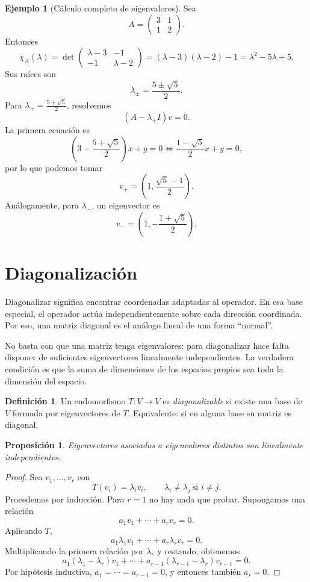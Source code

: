\documentclass[10pt,a4paper,oneside]{article}
\theoremstyle{plain}
\newtheorem{proposition}[theorem]{Proposición}
\theoremstyle{definition}
\newtheorem{definition}[theorem]{Definición}
\newtheorem{example}[theorem]{Ejemplo}
\theoremstyle{remark}
\newcommand{\charpol}{\chi}
\begin{document}
\begin{example}[Cálculo completo de eigenvalores]
Sea
\[
A=
\begin{pmatrix}
3 & 1\\
1 & 2
\end{pmatrix}.
\]
Entonces
\[
\charpol_A(\lambda)=
\det\begin{pmatrix}
\lambda-3 & -1\\
-1 & \lambda-2
\end{pmatrix}
=(\lambda-3)(\lambda-2)-1
=\lambda^2-5\lambda+5.
\]
Sus raíces son
\[
\lambda_{\pm}=\frac{5\pm\sqrt{5}}{2}.
\]
Para \(\lambda_+=\frac{5+\sqrt5}{2}\), resolvemos
\[
(A-\lambda_+ I)v=0.
\]
La primera ecuación es
\[
\left(3-\frac{5+\sqrt5}{2}\right)x+y=0
\iff
\frac{1-\sqrt5}{2}x+y=0,
\]
por lo que podemos tomar
\[
v_+=\left(1,\frac{\sqrt5-1}{2}\right).
\]
Análogamente, para \(\lambda_-\), un eigenvector es
\[
v_-\!=\!\left(1,-\frac{1+\sqrt5}{2}\right).
\]
\end{example}

\section{Diagonalización}
\begin{methodBox}
Diagonalizar significa encontrar coordenadas adaptadas al operador. En esa base especial, el operador actúa independientemente sobre cada dirección coordinada. Por eso, una matriz diagonal es el análogo lineal de una forma ``normal''.
\end{methodBox}

\begin{warningBox}
No basta con que una matriz tenga eigenvalores: para diagonalizar hace falta disponer de suficientes eigenvectores linealmente independientes. La verdadera condición es que la suma de dimensiones de los espacios propios sea toda la dimensión del espacio.
\end{warningBox}
\begin{definition}
Un endomorfismo \(T:V\to V\) es \emph{diagonalizable} si existe una base de \(V\) formada por eigenvectores de \(T\). Equivalente: si en alguna base su matriz es diagonal.
\end{definition}

\begin{proposition}
Eigenvectores asociados a eigenvalores distintos son linealmente independientes.
\end{proposition}

\begin{proof}
Sea \(v_1,\dots,v_r\) con
\[
T(v_i)=\lambda_i v_i,
\qquad
\lambda_i\neq \lambda_j\ \text{si }i\neq j.
\]
Procedemos por inducción. Para \(r=1\) no hay nada que probar. Supongamos una relación
\[
a_1v_1+\cdots+a_r v_r=0.
\]
Aplicando \(T\),
\[
a_1\lambda_1v_1+\cdots+a_r\lambda_r v_r=0.
\]
Multiplicando la primera relación por \(\lambda_r\) y restando, obtenemos
\[
a_1(\lambda_1-\lambda_r)v_1+\cdots+a_{r-1}(\lambda_{r-1}-\lambda_r)v_{r-1}=0.
\]
Por hipótesis inductiva, \(a_1=\cdots=a_{r-1}=0\), y entonces también \(a_r=0\). \end{proof}
\end{document}
